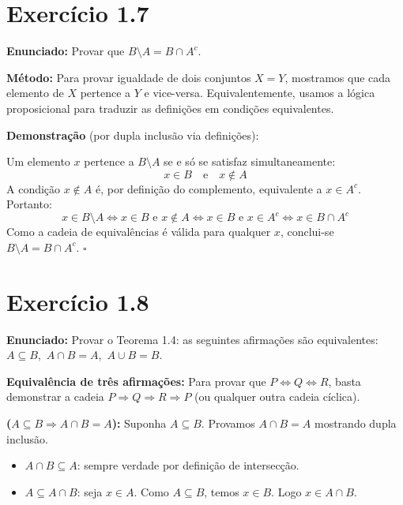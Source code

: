 \documentclass[12pt,a4paper]{article}
\begin{document}
\section*{Exercício 1.7}

\textbf{Enunciado:} Provar que $B \setminus A = B \cap A^c$.

\begin{teoribox}
\textbf{Método:} Para provar igualdade de dois conjuntos $X = Y$, mostramos que cada elemento de $X$ pertence a $Y$ e vice-versa. Equivalentemente, usamos a lógica proposicional para traduzir as definições em condições equivalentes.
\end{teoribox}

\textbf{Demonstração} (por dupla inclusão via definições):

Um elemento $x$ pertence a $B \setminus A$ se e só se satisfaz simultaneamente:
\[
x \in B \quad \text{e} \quad x \notin A
\]
A condição $x \notin A$ é, por definição do complemento, equivalente a $x \in A^c$. Portanto:
\[
x \in B \setminus A \iff x \in B \text{ e } x \notin A \iff x \in B \text{ e } x \in A^c \iff x \in B \cap A^c
\]
Como a cadeia de equivalências é válida para qualquer $x$, conclui-se $B \setminus A = B \cap A^c$. \hfill$\square$

\section*{Exercício 1.8}

\textbf{Enunciado:} Provar o Teorema 1.4: as seguintes afirmações são equivalentes: $A \subseteq B$,\ $A \cap B = A$,\ $A \cup B = B$.

\begin{teoribox}
\textbf{Equivalência de três afirmações:} Para provar que $P \Leftrightarrow Q \Leftrightarrow R$, basta demonstrar a cadeia $P \Rightarrow Q \Rightarrow R \Rightarrow P$ (ou qualquer outra cadeia cíclica).
\end{teoribox}

\textbf{($A \subseteq B \Rightarrow A \cap B = A$):} Suponha $A \subseteq B$. Provamos $A \cap B = A$ mostrando dupla inclusão.
\begin{itemize}
  \item $A \cap B \subseteq A$: sempre verdade por definição de intersecção.
  \item $A \subseteq A \cap B$: seja $x \in A$. Como $A \subseteq B$, temos $x \in B$. Logo $x \in A \cap B$.
\end{itemize}
\end{document}
